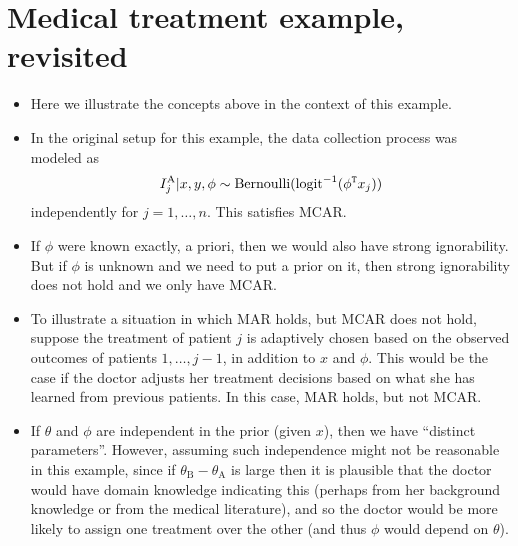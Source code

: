 \documentclass[12pt]{article}
\begin{document}
\section{Medical treatment example, revisited}

\begin{itemize}
\item Here we illustrate the concepts above in the context of this example.
\item In the original setup for this example, the data collection process was modeled as
$$ I_j^\text{A} | x,y,\phi \sim \operatorname*{Bernoulli}(\mathrm{logit}^{-1}(\phi^{\mathtt{T}} x_j)) $$
independently for $j = 1,\ldots,n$. This satisfies MCAR.
\item If $\phi$ were known exactly, a priori, then we would also have strong ignorability. But if $\phi$ is unknown and we need to put a prior on it, then strong ignorability does not hold and we only have MCAR.
\item To illustrate a situation in which MAR holds, but MCAR does not hold, suppose the treatment of patient $j$ is adaptively chosen based on the observed outcomes of patients $1,\ldots,j-1$, in addition to $x$ and $\phi$. This would be the case if the doctor adjusts her treatment decisions based on what she has learned from previous patients. In this case, MAR holds, but not MCAR.
\item If $\theta$ and $\phi$ are independent in the prior (given $x$), then we have ``distinct parameters''. However, assuming such independence might not be reasonable in this example, since if $\theta_\text{B} - \theta_\text{A}$ is large then it is plausible that the doctor would have domain knowledge indicating this (perhaps from her background knowledge or from the medical literature), and so the doctor would be more likely to assign one treatment over the other (and thus $\phi$ would depend on $\theta$). 
\end{itemize}
\end{document}
